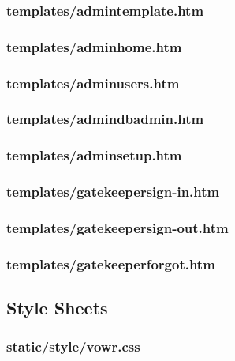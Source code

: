 \documentclass{book}
\renewcommand{\,}{\kern0.2ex}
\begin{document}
	\subsubsection{templates/admin\textunderscore template.htm}
	
	\subsubsection{templates/admin\textunderscore home.htm}
	
	\subsubsection{templates/admin\textunderscore users.htm}
	
	\subsubsection{templates/admin\textunderscore dbadmin.htm}
	
	\subsubsection{templates/admin\textunderscore setup.htm}
	
	\subsubsection{templates/gatekeeper\textunderscore sign-in.htm}
	
	\subsubsection{templates/gatekeeper\textunderscore sign-out.htm}
	
	\subsubsection{templates/gatekeeper\textunderscore forgot.htm}
	
	
	\subsection{Style Sheets}
	\subsubsection{static/style/vowr.css}
	
	
\end{document}
